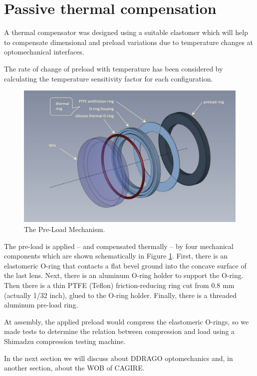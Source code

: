 \documentclass{report}
\begin{document}
\section{Passive thermal compensation}

A thermal compensator was designed using a suitable elastomer which will help to compensate dimensional and preload variations due to temperature changes at optomechanical interfaces.

The rate of change of preload with temperature has been considered by calculating the temperature sensitivity factor for each configuration.

\begin{figure}
\begin{center}
\includegraphics[width=0.7\linewidth]{figures/rosalia-rings.png}
\end{center}
\caption{The Pre-Load Mechanism.}
\label{figure:rosalia-rings}
\end{figure}

The pre-load is applied – and compensated thermally – by four mechanical components which are shown schematically in Figure \ref{figure:rosalia-rings}. First, there is an elastomeric O-ring that contacts a flat bevel ground into the concave surface of the last lens. Next, there is an aluminum O-ring holder to support the O-ring. Then there is a thin PTFE (Teflon) friction-reducing ring cut from 0.8 mm (actually 1/32 inch), glued to the O-ring holder. Finally, there is a threaded aluminum pre-load ring.


At assembly, the applied preload would compress the elastomeric O-rings, so we made tests to determine the relation between compression and load using a Shimadzu compression testing machine.

In the next section we will discuss about DDRAGO optomechanics and, in another section, about the WOB of CAGIRE.


\end{document}
